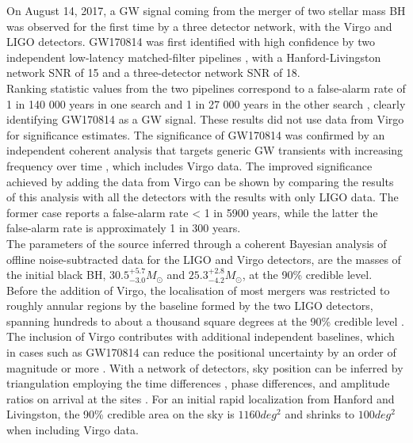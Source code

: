 \documentclass[binding=0.6cm, LaM]{sapthesis}
\begin{document}
	On August 14, 2017, a GW signal coming from the merger of two stellar mass BH 
	was observed for the first time by a three detector network, with the Virgo and LIGO detectors. 
	GW170814 was first identified with high confidence by two independent 
	low-latency matched-filter pipelines \cite{111,143-146,149},
	with a Hanford-Livingston network SNR of 15 and a three-detector network SNR of 18. \\
	Ranking statistic values from the two pipelines correspond to 
	a false-alarm rate of 1 in 140 000 years in one search \cite{114,143} 
	and 1 in 27 000 years in the other search \cite{111,146,149,150}, 
	clearly identifying GW170814 as a GW signal. 
	These results did not use data from Virgo for significance estimates.
	The significance of GW170814 was confirmed by 
	an independent coherent analysis that targets 
	generic GW transients with increasing frequency over time \cite{151},
	which includes Virgo data. 
	The improved significance achieved by adding the data from Virgo 
	can be shown by comparing the results of this analysis with 
	all the detectors with the results with only LIGO data.
	The former case reports a false-alarm rate < 1 in 5900 years,
	while the latter the false-alarm rate is approximately 1 in 300 years. \\ 
	The parameters of the source inferred through a coherent Bayesian analysis \cite{93, 152} 
	of offline noise-subtracted data for the LIGO and Virgo detectors, 
	are the  masses of the initial black BH, $30.5^{+5.7}_{-3.0}M_\odot$ 
	and $25.3^{+2.8}_{-4.2}M_\odot$, at the 90\% credible level. \\
	Before the addition of Virgo, the localisation of most mergers 
	was restricted to roughly annular regions by the baseline formed by the two LIGO detectors,
	spanning hundreds to about a thousand square degrees at the 90\% credible level \cite{165-167}. 
	The inclusion of Virgo contributes with additional independent baselines, 
	which in cases such as GW170814 can reduce the positional uncertainty by an order of magnitude or more \cite{166}. 
	With a network of detectors, sky position can be inferred by triangulation employing 	
	the time differences \cite{168,169}, phase differences, and amplitude ratios on arrival at the sites \cite{170}. 
	For an initial rapid localization from Hanford and Livingston, 
	the 90\% credible area on the sky is $1160 deg^2$ and shrinks to $100 deg^2$ when including Virgo data. 
\end{document}
